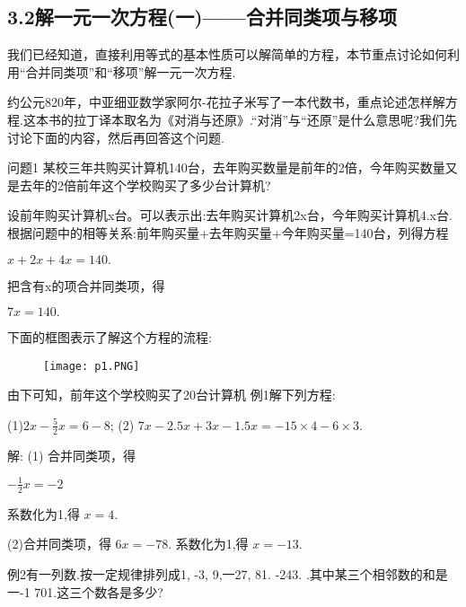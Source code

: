 \documentclass{article}
\date{}
\begin{document}
\title{}
\maketitle
\subsection*{ 3.2解一元一次方程(一)——合并同类项与移项}

\begin{article}
    \indent 我们已经知道，直接利用等式的基本性质可以解简单的方程，本节重点讨论如何利用“合并同类项”和“移项”解一元一次方程.
    
    \indent 约公元820年，中亚细亚数学家阿尔-花拉子米写了一本代数书，重点论述怎样解方程.这本书的拉丁译本取名为《对消与还原》.“对消”与“还原”是什么意思呢?我们先讨论下面的内容，然后再回答这个问题.
    
    \begin{example}
    \indent  问题1 某校三年共购买计算机140台，去年购买数量是前年的2倍，今年购买数量又是去年的2倍前年这个学校购买了多少台计算机?
    
    \indent 设前年购买计算机x台。可以表示出:去年购买计算机2x台，今年购买计算机4.x台.根据问题中的相等关系:前年购买量+去年购买量+今年购买量=140台，列得方程
    \begin{center}$x+2x+4x=140.$\end{center}
    
    \indent 把含有x的项合并同类项，得
    \begin{center}$7x= 140.$\end{center}

     \indent 下面的框图表示了解这个方程的流程:
     \begin{figure}
         \centering
         \texttt{[image: p1.PNG]}
     \end{figure}
     
     \indent 由下可知，前年这个学校购买了20台计算机
     \newpage 
      例1解下列方程:      
     
      (1)$ 2x-\frac{5}{2}x=6-8$;  (2) $7x-2.5x+3x-1.5x=-15\times4-6\times3$.
      
      解: (1) 合并同类项，得  
      
      $-\frac{1}{2}x=-2$
      
      系数化为1,得      
      $x=4$.
      
      (2)合并同类项，得     
     $6x=-78$.
      系数化为1,得      
      $x=-13$. 
      
      例2有一列数.按一定规律排列成1, -3, 9,一27, 81. -243. .其中某三个相邻数的和是一-1 701.这三个数各是多少?
      

\end{example}
\end{article}
\end{document}
